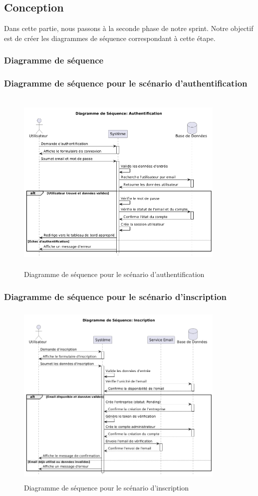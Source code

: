\subsection{Conception}
\noindent Dans cette partie, nous passons à la seconde phase de notre sprint. Notre objectif est de créer les diagrammes de séquence correspondant à cette étape.

\subsubsection{Diagramme de séquence}

\subsubsection{Diagramme de séquence pour le scénario d'authentification}
\begin{figure}[H]
    \centering
    \includegraphics[width=10cm,height=9cm]{images/authentifiaction.png}
    \caption{Diagramme de séquence pour le scénario d'authentification}
\end{figure}

\subsubsection{Diagramme de séquence pour le scénario d'inscription}
\begin{figure}[H]
    \centering
    \includegraphics[width=10cm,height=9cm]{images/inscription.png}
    \caption{Diagramme de séquence pour le scénario d'inscription}
\end{figure}

